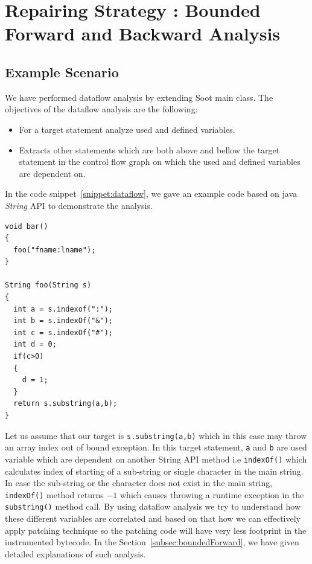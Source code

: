 

\chapter{Repairing Strategy : Bounded Forward and Backward Analysis}
\label{chapter:boundedAnalysis}

\section{Example Scenario}
\label{exampleScenario}

We have performed dataflow analysis by extending Soot main class. The objectives
of the dataflow analysis are the following:

\begin{itemize}
  \item For a target statement analyze used and defined variables.
  
  \item Extracts other statements which are both above and bellow the target
  statement in the control flow graph on which the used and defined variables
  are dependent on.
  
\end{itemize}

In the code snippet~\ref{snippet:dataflow}, we gave an example code based on java
\emph{String} API to demonstrate the analysis.

\onehalfspacing
\lstset{language=Java, caption=Dataflow analysis,
label=snippet:dataflow}
\begin{lstlisting}
void bar()
{
  foo("fname:lname");
}

String foo(String s)
{
  int a = s.indexof(":");
  int b = s.indexOf("&");
  int c = s.indexOf("#");
  int d = 0;
  if(c>0)
  {
    d = 1;
  }
  return s.substring(a,b);
}

\end{lstlisting}

Let us assume that our target is \texttt{s.substring(a,b)} which in this case
may throw an array index out of bound exception. In this target statement,
\texttt{a} and \texttt{b} are used variable which are dependent on another
String API method i.e \texttt{indexOf()} which calculates index of starting of a
sub-string or single character in the main string. In case the sub-string or the
character does not exist in the main string, \texttt{indexOf()} method returns
$-1$ which causes throwing a runtime exception in the \texttt{substring()}
method call.
\newline
By using dataflow analysis we try to understand how these different variables
are correlated and based on that how we can effectively apply patching technique
so the patching code will have very less footprint in the instrumented bytecode.
In the Section~\ref{subsec:boundedForward}, we have given detailed explanations
of such analysis.


